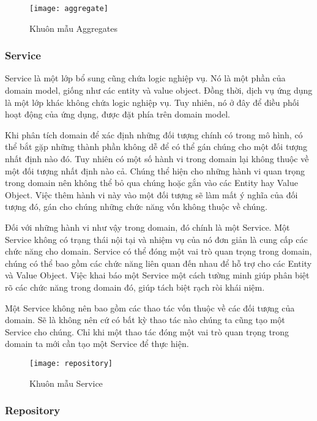 \begin{figure}[H]
	\centering
	\texttt{[image: aggregate]}
	\caption{Khuôn mẫu Aggregates}
\end{figure}

\subsubsection{Service}

Service là một lớp bổ sung cũng chứa logic nghiệp vụ. Nó là một phần của domain model, giống như các entity và value object. Đồng thời, dịch vụ ứng dụng là một lớp khác không chứa logic nghiệp vụ. Tuy nhiên, nó ở đây để điều phối hoạt động của ứng dụng, được đặt phía trên domain model.

Khi phân tích domain để xác định những đối tượng chính có trong mô hình, có thể bắt gặp những thành phần không dễ để có thể gán chúng cho một đối tượng nhất định nào đó. Tuy nhiên có một số hành vi trong domain lại không thuộc về một đối tượng nhất định nào cả. Chúng thể hiện cho những hành vi quan trọng trong domain nên không thể bỏ qua chúng hoặc gắn vào các Entity hay Value Object. Việc thêm hành vi này vào một đối tượng sẽ làm mất ý nghĩa của đối tượng đó, gán cho chúng những chức năng vốn không thuộc về chúng.

Đối với những hành vi như vậy trong domain, đó chính là một Service. Một Service không có trạng thái nội tại và nhiệm vụ của nó đơn giản là cung cấp các chức năng cho domain. Service có thể đóng một vai trò quan trọng trong domain, chúng có thể bao gồm các chức năng liên quan đến nhau để hỗ trợ cho các Entity và Value Object. Việc khai báo một Service một cách tường minh giúp phân biệt rõ các chức năng trong domain đó, giúp tách biệt rạch ròi khái niệm.

Một Service không nên bao gồm các thao tác vốn thuộc về các đối tượng của domain. Sẽ là không nên cứ có bất kỳ thao tác nào chúng ta cũng tạo một Service cho chúng. Chỉ khi một thao tác đóng một vai trò quan trọng trong domain ta mới cần tạo một Service để thực hiện.

\begin{figure}[H]
	\centering
	\texttt{[image: repository]}
	\caption{Khuôn mẫu Service}
\end{figure}

\subsubsection{Repository}

